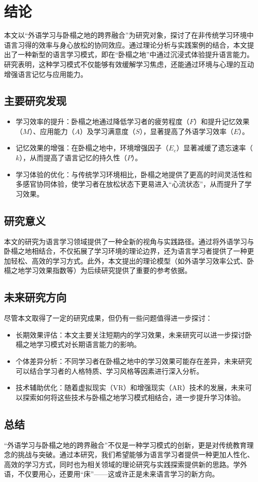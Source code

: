 
\section{结论}

本文以“外语学习与卧榻之地的跨界融合”为研究对象，探讨了在非传统学习环境中语言习得的效率与身心放松的协同效应。通过理论分析与实践案例的结合，本文提出了一种新型的语言学习模式，即在“卧榻之地”中通过沉浸式体验提升语言能力。研究表明，这种学习模式不仅能够有效缓解学习焦虑，还能通过环境与心理的互动增强语言记忆与应用能力。

\subsection{主要研究发现}
\begin{itemize}
    \item 学习效率的提升：卧榻之地通过降低学习者的疲劳程度（$F$）和提升记忆效果（$M$）、应用能力（$A$）及学习满意度（$S$），显著提高了外语学习效率（$E$）。
    \item 记忆效果的增强：在卧榻之地中，环境增强因子（$E_e$）显著减缓了遗忘速率（$k$），从而提高了语言记忆的持久性（$P$）。
    \item 学习体验的优化：与传统学习环境相比，卧榻之地提供了更高的时间灵活性和多感官协同体验，使学习者在放松状态下更易进入“心流状态”，从而提升了学习效果。
\end{itemize}

\subsection{研究意义}
本文的研究为语言学习领域提供了一种全新的视角与实践路径。通过将外语学习与卧榻之地相结合，不仅拓展了学习环境的理论边界，还为语言学习者提供了一种更加轻松、高效的学习方式。此外，本文提出的理论模型（如外语学习效率公式、卧榻之地学习效果指数等）为后续研究提供了重要的参考依据。

\subsection{未来研究方向}
尽管本文取得了一定的研究成果，但仍有一些问题值得进一步探讨：
\begin{itemize}
    \item 长期效果评估：本文主要关注短期内的学习效果，未来研究可以进一步探讨卧榻之地学习模式对长期语言能力的影响。
    \item 个体差异分析：不同学习者在卧榻之地中的学习效果可能存在差异，未来研究可以结合学习者的人格特质、学习风格等因素进行深入分析。
    \item 技术辅助优化：随着虚拟现实（VR）和增强现实（AR）技术的发展，未来可以探索如何将这些技术与卧榻之地学习模式相结合，进一步提升学习体验。
\end{itemize}

\subsection{总结}
“外语学习与卧榻之地的跨界融合”不仅是一种学习模式的创新，更是对传统教育理念的挑战与突破。通过本研究，我们希望能够为语言学习者提供一种更加人性化、高效的学习方式，同时也为相关领域的理论研究与实践探索提供新的思路。学外语，不仅要用心，还要用“床”——这或许正是未来语言学习的新方向。